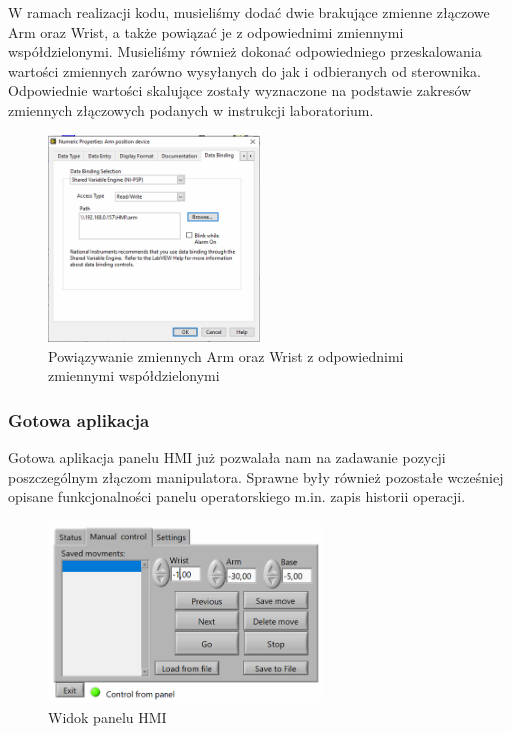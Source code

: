 \documentclass[margin = 2cm]{article}
\begin{document}
W ramach realizacji kodu, musieliśmy dodać dwie brakujące zmienne złączowe Arm oraz Wrist, a także powiązać je  z odpowiednimi zmiennymi współdzielonymi. Musieliśmy również dokonać odpowiedniego przeskalowania wartości zmiennych zarówno wysyłanych do jak i odbieranych od sterownika. Odpowiednie wartości skalujące zostały wyznaczone na podstawie zakresów zmiennych złączowych podanych w instrukcji laboratorium.

\begin{figure}[H]
	\centering
	\includegraphics[width=0.5\textwidth]{zmiene}
	\caption{Powiązywanie zmiennych Arm oraz Wrist z odpowiednimi zmiennymi współdzielonymi}
\end{figure}

\subsubsection{Gotowa aplikacja}

Gotowa aplikacja panelu HMI już pozwalała nam na zadawanie pozycji poszczególnym złączom manipulatora. Sprawne były również pozostałe wcześniej opisane funkcjonalności panelu operatorskiego m.in. zapis historii operacji.

\begin{figure}[H]
	\centering
	\includegraphics[width=0.65\textwidth]{panel}
	\caption{Widok panelu HMI}
\end{figure}
\end{document}
